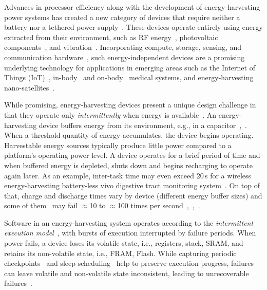 Advances in processor efficiency along with the development of energy-harvesting power systems has created a new category of devices that require neither a battery nor a tethered power supply~\cite{prasad_comst_2014,lucia_snapl_2017,soyata_csm_2016}. These devices operate entirely using energy extracted from their environment, such as RF energy~\cite{rf_powered_computing_gollakota_2014}, photovoltaic components~\cite{margolies_infocom_2016,margolies_tosn_2016}, and vibration~\cite{gorlatova_sigmetrics_2014}. Incorporating compute, storage, sensing, and communication hardware~\cite{wisp5,moo}, such energy-independent devices are a promising underlying technology for applications in emerging areas such as the Internet of Things (IoT)~\cite{ku_cst_2016}, in-body~\cite{nadeau_naturebio_2017} and on-body~\cite{bandodkar_electroanalysis_2015} medical systems, and energy-harvesting nano-satellites~\cite{kicksat}.

While promising, energy-harvesting devices present a unique design challenge in that they operate only {\em intermittently} when energy is available~\cite{hicks_isca_2017,lucia_snapl_2017}. An
energy-harvesting device buffers energy from its environment, e.g., in a capacitor~\cite[Fig. 3]{gorlatova_tmc_2013},~\cite[Fig. 1]{gunduz_commag_2014}. When a threshold quantity of energy accumulates, the device begins operating. Harvestable energy sources typically produce little power compared to a platform's operating power level. A device operates for a brief period of time and when buffered energy is depleted, shuts down and begins recharging to operate again later. As an example, inter-task time may even exceed 20\,s for a wireless energy-harvesting battery-less vivo digestive tract monitoring system~\cite[Fig. 3c]{nadeau_naturebio_2017}. On top of that, charge and discharge times vary by device (different energy buffer sizes) and some of them~\cite{wisp} may fail $\approx$10 to $\approx$100 times per second~\cite[Fig. 1]{tan_infocom_2016},~\cite[Fig. 1]{mementos},~\cite[Fig. 3]{nvp}.


Software in an energy-harvesting system operates according to the {\em intermittent execution model}~\cite{dino,lucia_snapl_2017}, with bursts of execution interrupted by failure periods. When power fails, a device loses its volatile state, i.e., registers, stack, SRAM, and retains its non-volatile state, i.e., FRAM, Flash. While capturing periodic checkpoints~\cite{mementos,quickrecall} and sleep scheduling~\cite{dewdrop,hibernus,hibernusplusplus} help to preserve execution progress, failures can leave volatile and non-volatile state inconsistent, leading to unrecoverable failures~\cite{mspcdino,edb}. 


